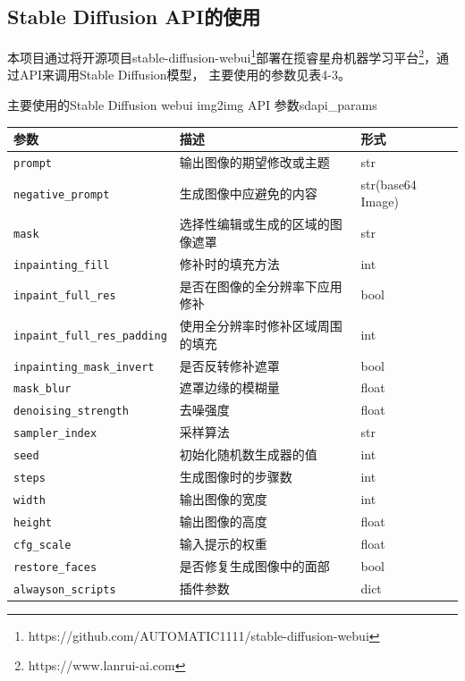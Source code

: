 \documentclass[a4paper,AutoFakeBold,oneside,12pt]{book}
\begin{document}
\subsection{Stable Diffusion API的使用}
本项目通过将开源项目stable-diffusion-webui\footnote{https://github.com/AUTOMATIC1111/stable-diffusion-webui}部署在揽睿星舟机器学习平台\footnote{https://www.lanrui-ai.com}，通过API来调用Stable Diffusion模型，
主要使用的参数见表4-3。
\begin{bupttable}{主要使用的Stable Diffusion webui img2img API 参数}{sdapi_params}
    \begin{tabular}{|l|l|l|}
        \hline \textbf{参数} & \textbf{描述} & \textbf{形式} \\
        \hline \texttt{prompt} & 输出图像的期望修改或主题 & str \\
        \hline \texttt{negative\_prompt} & 生成图像中应避免的内容 & str(base64 Image) \\
        \hline \texttt{mask} & 选择性编辑或生成的区域的图像遮罩 & str \\
        \hline \texttt{inpainting\_fill} & 修补时的填充方法 & int \\
        \hline \texttt{inpaint\_full\_res} & 是否在图像的全分辨率下应用修补 & bool \\
        \hline \texttt{inpaint\_full\_res\_padding} & 使用全分辨率时修补区域周围的填充 & int \\
        \hline \texttt{inpainting\_mask\_invert} & 是否反转修补遮罩 & bool \\
        \hline \texttt{mask\_blur} & 遮罩边缘的模糊量 & float \\
        \hline \texttt{denoising\_strength} & 去噪强度 & float \\
        \hline \texttt{sampler\_index} & 采样算法 & str \\
        \hline \texttt{seed} & 初始化随机数生成器的值 & int \\
        \hline \texttt{steps} & 生成图像时的步骤数 & int \\
        \hline \texttt{width} & 输出图像的宽度 & int \\
        \hline \texttt{height} & 输出图像的高度 & float \\
        \hline \texttt{cfg\_scale} & 输入提示的权重 & float \\
        \hline \texttt{restore\_faces} & 是否修复生成图像中的面部 & bool \\
        \hline \texttt{alwayson\_scripts} & 插件参数 & dict \\
        \hline
    \end{tabular}
\end{bupttable}
\end{document}
